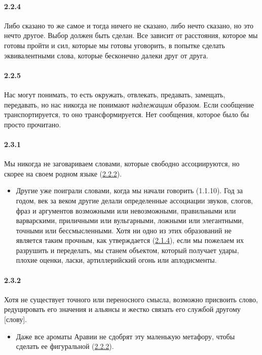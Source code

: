 \paragraph{2.2.4}\hypertarget{par:2.2.4}{} Либо сказано то же самое и тогда ничего не сказано, либо нечто сказано, но это нечто другое. Выбор должен быть сделан. Все зависит от расстояния, которое мы готовы пройти и сил, которые мы готовы уговорить, в попытке сделать эквивалентными слова,
которые бесконечно далеки друг от друга. 

\paragraph{2.2.5}\hypertarget{par:2.2.5}{} Нас могут понимать, то есть окружать, отвлекать, предавать, замещать, передавать, но нас никогда не понимают {\itshape надлежащим} образом. Если сообщение транспортируется, то оно трансформируется. Нет сообщения, которое было бы просто прочитано.

\paragraph{2.3.1}\hypertarget{par:2.3.1}{} Мы никогда не заговариваем словами, которые свободно ассоциируются, но скорее на своем родном языке (\hyperlink{par:2.2.2}{2.2.2}). 
	\begin{itemize}
	\item 
	Другие уже поиграли словами, когда мы начали говорить (1.1.10). Год за годом, век за веком другие делали определенные ассоциации звуков, слогов, фраз и аргументов возможными или невозможными, правильными или варварскими, приличными или вульгарными, ложными или элегантными, точными или бессмысленными. Хотя ни одно из этих образований не является таким прочным, как утверждается (\hyperlink{par:2.1.4}{2.1.4}), если мы пожелаем их разрушить и переделать, мы станем объектом, который получает удары, плохие оценки, ласки, артиллерийский огонь или аплодисменты.
	\end{itemize}

\paragraph{2.3.2}\hypertarget{par:2.3.2}{} Хотя не существует точного или переносного смысла, возможно присвоить слово, редуцировать его значения и альянсы и жестко связать его службой другому [слову]. 
	\begin{itemize}
	\item 
	Даже все ароматы Аравии не сдобрят эту маленькую метафору, чтобы сделать ее фигуральной (\hyperlink{par:2.2.2}{2.2.2}). 
	\end{itemize}

